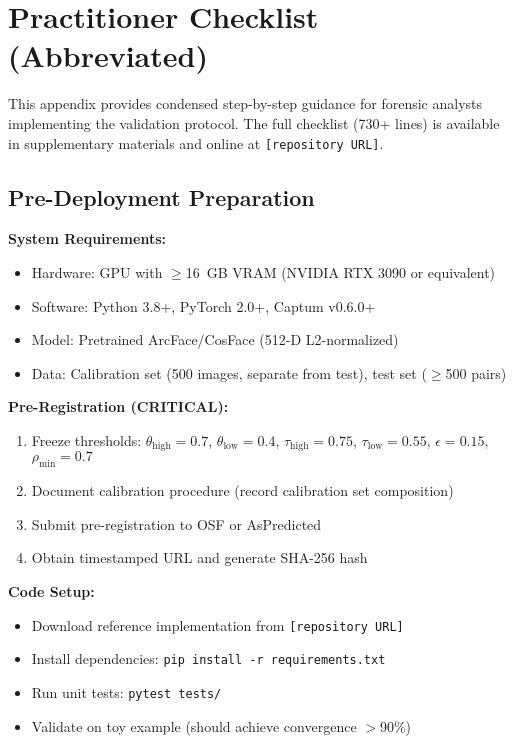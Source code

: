 
\section{Practitioner Checklist (Abbreviated)}
\label{sec:appendix_checklist}

This appendix provides condensed step-by-step guidance for forensic analysts implementing the validation protocol. The full checklist (730+ lines) is available in supplementary materials and online at \texttt{[repository URL]}.

\subsection{Pre-Deployment Preparation}

\textbf{System Requirements:}
\begin{itemize}
\item Hardware: GPU with $\geq$16~GB VRAM (NVIDIA RTX 3090 or equivalent)
\item Software: Python 3.8+, PyTorch 2.0+, Captum v0.6.0+
\item Model: Pretrained ArcFace/CosFace (512-D L2-normalized)
\item Data: Calibration set (500 images, separate from test), test set ($\geq$500 pairs)
\end{itemize}

\textbf{Pre-Registration (CRITICAL):}
\begin{enumerate}
\item Freeze thresholds: $\theta_{\text{high}}=0.7$, $\theta_{\text{low}}=0.4$, $\tau_{\text{high}}=0.75$, $\tau_{\text{low}}=0.55$, $\epsilon=0.15$, $\rho_{\text{min}}=0.7$
\item Document calibration procedure (record calibration set composition)
\item Submit pre-registration to OSF or AsPredicted
\item Obtain timestamped URL and generate SHA-256 hash
\end{enumerate}

\textbf{Code Setup:}
\begin{itemize}
\item Download reference implementation from \texttt{[repository URL]}
\item Install dependencies: \texttt{pip install -r requirements.txt}
\item Run unit tests: \texttt{pytest tests/}
\item Validate on toy example (should achieve convergence $>$90\%)
\end{itemize}

